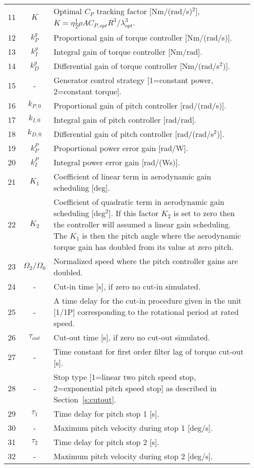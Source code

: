 \begin{table}[!htbp]
\begin{center}
\begin{tabular}{r|c|p{11.5cm}}
\hline
11 & $K$ 			& Optimal $C_P$ tracking factor [Nm/(rad/s)$^2$], $K=\eta \frac12 \rho A C_{P,opt} R^3/\lambda_{opt}^3$. \\
12 & $k_P^g$ 		& Proportional gain of torque controller [Nm/(rad/s)]. \\
13 & $k_I^g$ 		& Integral gain of torque controller [Nm/rad]. \\
14 & $k_D^g$ 		& Differential gain of torque controller [Nm/(rad/s$^2$)]. \\
15 & - 			& Generator control strategy [1=constant power, 2=constant torque]. \\
16 & $k_{P,0}$ 		& Proportional gain of pitch controller [rad/(rad/s)]. \\
17 & $k_{I,0}$ 		& Integral gain of pitch controller [rad/rad].\\
18 & $k_{D,0}$ 		& Differential gain of pitch controller [rad/(rad/s$^2$)]. \\
19 & $k_P^P$ 		& Proportional power error gain [rad/W]. \\
20 & $k_I^P$ 		& Integral power error gain [rad/(Ws)]. \\
21 & $K_1$ 			& Coefficient of linear term in aerodynamic gain scheduling [deg]. \\
22 & $K_2$ 			& Coefficient of quadratic term in aerodynamic gain scheduling [deg$^2$]. If this factor $K_2$ is set to zero then the controller will assumed a linear gain scheduling. The $K_1$ is then the pitch angle where the aerodynamic torque gain has doubled from its value at zero pitch.\\
23 & $\Omega_2/\Omega_0$ & Normalized speed where the pitch controller gains are doubled.\\
\hline
24 & - 			& Cut-in time [s], if zero no cut-in simulated. \\
25 & - 			& A time delay for the cut-in procedure given in the unit [1/1P] corresponding to the rotational period at rated speed.\\
26 & $\tau_{out}$ 		& Cut-out time [s], if zero no cut-out simulated. \\
27 & - 			& Time constant for first order filter lag of torque cut-out [s]. \\
28 & - 			& Stop type [1=linear two pitch speed stop, 2=exponential pitch speed stop] as described in Section~\ref{s:cutout}. \\
29 & $\tau_1$ 		& Time delay for pitch stop 1 [s]. \\
30 & - 			& Maximum pitch velocity during stop 1 [deg/s]. \\
31 & $\tau_2$ 		& Time delay for pitch stop 2 [s].\\
32 & - 			& Maximum pitch velocity during stop 2 [deg/s].
\end{tabular}
\end{center}
\end{table}
